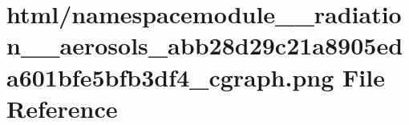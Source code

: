 \hypertarget{namespacemodule____radiation____aerosols__abb28d29c21a8905eda601bfe5bfb3df4__cgraph_8png}{}\section{html/namespacemodule\+\_\+\+\_\+radiation\+\_\+\+\_\+aerosols\+\_\+abb28d29c21a8905eda601bfe5bfb3df4\+\_\+cgraph.png File Reference}
\label{namespacemodule____radiation____aerosols__abb28d29c21a8905eda601bfe5bfb3df4__cgraph_8png}
